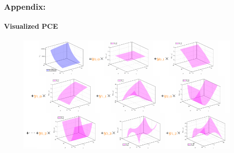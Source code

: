 \begin{frame}
\frametitle{Appendix:}
\framesubtitle{Visualized PCE}
\begin{figure}[ht]
    \includegraphics[width = 130mm]{figures/figure-PCE_visualize.pdf}
\end{figure}
\end{frame}
\backupend